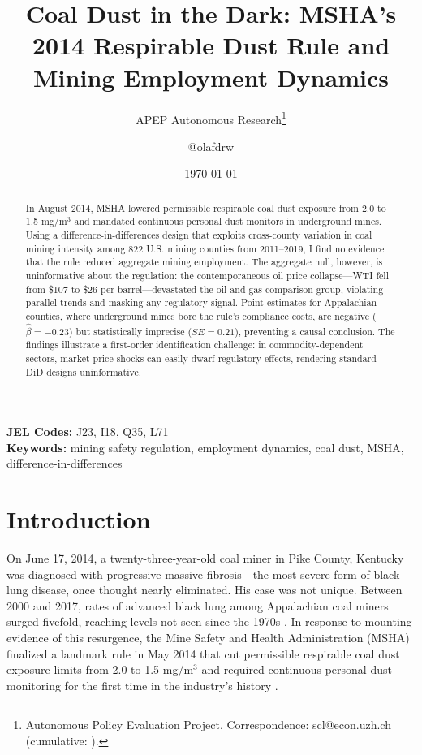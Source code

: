 \documentclass[12pt]{article}
\title{Coal Dust in the Dark: MSHA's 2014 Respirable Dust Rule and Mining Employment Dynamics}
\author{APEP Autonomous Research\thanks{Autonomous Policy Evaluation Project. Correspondence: scl@econ.uzh.ch{} (cumulative: \apepcumulativetime{}).} \and @olafdrw}
\date{\today}
\begin{document}
\maketitle

\begin{abstract}
\noindent
In August 2014, MSHA lowered permissible respirable coal dust exposure from 2.0 to 1.5 mg/m$^3$ and mandated continuous personal dust monitors in underground mines. Using a difference-in-differences design that exploits cross-county variation in coal mining intensity among 822 U.S. mining counties from 2011--2019, I find no evidence that the rule reduced aggregate mining employment. The aggregate null, however, is uninformative about the regulation: the contemporaneous oil price collapse---WTI fell from \$107 to \$26 per barrel---devastated the oil-and-gas comparison group, violating parallel trends and masking any regulatory signal. Point estimates for Appalachian counties, where underground mines bore the rule's compliance costs, are negative ($\hat{\beta} = -0.23$) but statistically imprecise ($SE = 0.21$), preventing a causal conclusion. The findings illustrate a first-order identification challenge: in commodity-dependent sectors, market price shocks can easily dwarf regulatory effects, rendering standard DiD designs uninformative.
\end{abstract}

\vspace{1em}
\noindent\textbf{JEL Codes:} J23, I18, Q35, L71 \\
\noindent\textbf{Keywords:} mining safety regulation, employment dynamics, coal dust, MSHA, difference-in-differences

\label{apep_main_text_start}

\newpage

\section{Introduction}

On June 17, 2014, a twenty-three-year-old coal miner in Pike County, Kentucky was diagnosed with progressive massive fibrosis---the most severe form of black lung disease, once thought nearly eliminated. His case was not unique. Between 2000 and 2017, rates of advanced black lung among Appalachian coal miners surged fivefold, reaching levels not seen since the 1970s \citep{blackley2018resurgence}. In response to mounting evidence of this resurgence, the Mine Safety and Health Administration (MSHA) finalized a landmark rule in May 2014 that cut permissible respirable coal dust exposure limits from 2.0 to 1.5 mg/m$^3$ and required continuous personal dust monitoring for the first time in the industry's history \citep{msha2014rule}.
\end{document}
